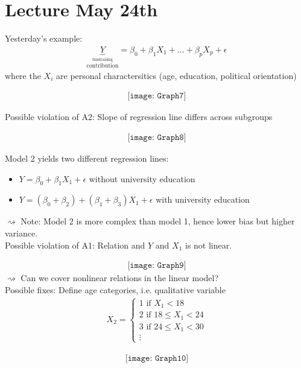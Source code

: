 \documentclass[11pt,a4paper,numbers=endperiod]{scrartcl}
\newcommand{\id}{\hspace*{4mm}}
\begin{document}
{\section{Lecture May 24th}

Yesterday's example: \begin{align*}
	\underbrace{Y}_{\stackrel{\text{fundraising}}{\text{contribution}}} = \beta_0 + \beta_1X_1 + \ldots + \beta_pX_p + \epsilon
\end{align*}
where the $X_i$ are personal charactersitics (age, education, political orientation)

\begin{align*}
	\texttt{[image: Graph7]}
\end{align*}

Possible violation of A2: Slope of regression line differs across subgroups

\begin{align*}
	\texttt{[image: Graph8]}
\end{align*}

Model 2 yields two different regression lines: \begin{itemize}
	\item $Y = \beta_0 + \beta_1 X_1 + \epsilon$ \id \id \id \id \id without university education
	\item $Y = (\beta_0 + \beta_2) + (\beta_1 + \beta_3)X_1 + \epsilon$ \id with university education
\end{itemize}
$\rightsquigarrow$ Note: Model 2 is more complex than model 1, hence lower bias but higher variance.\\
Possible violation of A1: Relation and $Y$ and $X_1$ is not linear. 

\begin{align*}
	\texttt{[image: Graph9]}
\end{align*}
$\rightsquigarrow$ Can we cover nonlinear relations in the linear model?\\
Possible fixes: Define age categories, i.e. qualitative variable \begin{align*}
	X_2 = \begin{cases}
	1 \text{ if } X_1 < 18\\
	2 \text{ if } 18 \leq X_1 < 24\\
	3 \text{ if } 24 \leq X_1 < 30\\
	\vdots
	\end{cases}
\end{align*}

\begin{align*}
	\texttt{[image: Graph10]}
\end{align*}

}
\end{document}
